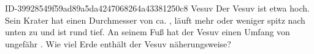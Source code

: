 \begin{exercise}
      {ID-39928549f59ad89a5da4247068264a43381250c8}
      {Vesuv}
  \ifproblem\problem
    Der Vesuv ist etwa  hoch. Sein Krater hat einen Durchmesser
    von ca. , läuft mehr oder weniger spitz nach unten zu und
    ist rund  tief. An seinem Fuß hat der Vesuv einen Umfang
    von ungefähr . Wie viel Erde enthält der Vesuv näherungsweise?
  \fi
\end{exercise}
